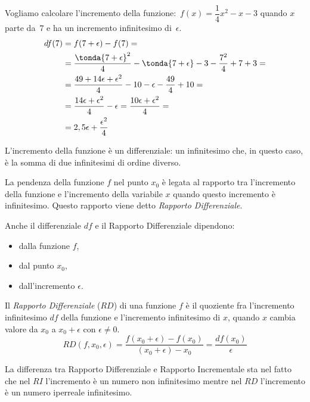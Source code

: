 \noindent \begin{minipage}{.48 \textwidth}
\begin{esempio}
Vogliamo calcolare l'incremento della 
funzione:~\(f(x) = \dfrac{1}{4} x^2 -x -3\)
quando \(x\) parte da~\(7\) e ha un incremento infinitesimo di~\(\epsilon\).
\begin{align*}
  df(7) &= f(7+\epsilon) - f(7) = \\
        &= \dfrac{\tonda{7 +\epsilon}^2}{4}  -\tonda{7 +\epsilon} -3 - 
           \dfrac{7^2}{4}  +7 +3 =\\
        &= \dfrac{49 +14 \epsilon +\epsilon^2}{4} -10 -\epsilon - 
           \dfrac{49}{4} +10 =\\
        &= \dfrac{14 \epsilon +\epsilon^2}{4} -\epsilon 
        = \dfrac{10 \epsilon +\epsilon^2}{4} =\\
        &= 2,5 \epsilon + \dfrac{\epsilon^2}{4}
\end{align*}
\end{esempio}
\end{minipage}
 \hfill
\begin{minipage}{.48 \textwidth}
 \begin{center}
\differenziale
 \end{center}
\end{minipage}
L'incremento della funzione è un differenziale: un infinitesimo che, 
in questo caso, è la somma di due infinitesimi di ordine diverso. 

La pendenza della funzione \(f\) nel punto \(x_0\) è legata al 
rapporto tra l'incremento della funzione e l'incremento della variabile 
\(x\) quando questo incremento è infinitesimo. 
Questo rapporto viene detto \emph{Rapporto Differenziale}.

Anche il differenziale \(df\) e il Rapporto Differenziale dipendono: 
\begin{multicols}{3}
\begin{itemize} [nosep]
\item dalla funzione \(f\), 
\item dal punto \(x_0\), 
\item dall'incremento \(\epsilon\).
\end{itemize}
\end{multicols}
\begin{definizione}
Il \emph{Rapporto Differenziale} (\(RD\)) di una funzione \(f\) è il 
quoziente fra l'incremento infinitesimo \(df\) della funzione 
e l'incremento infinitesimo di \(x\), quando \(x\) cambia valore da 
\(x_0\) a \(x_0+\epsilon\) con \(\epsilon \ne 0\).
\[RD(f, x_0, \epsilon) = 
\frac{f(x_0+\epsilon)-f(x_0)}{(x_0+\epsilon)- x_0} =
\frac{df(x_0)}{\epsilon}\]
\end{definizione}
La differenza tra Rapporto Differenziale e Rapporto Incrementale sta nel 
fatto che nel \(RI\) l'incremento è un numero non infinitesimo mentre 
nel \(RD\) l'incremento è un numero iperreale infinitesimo.

